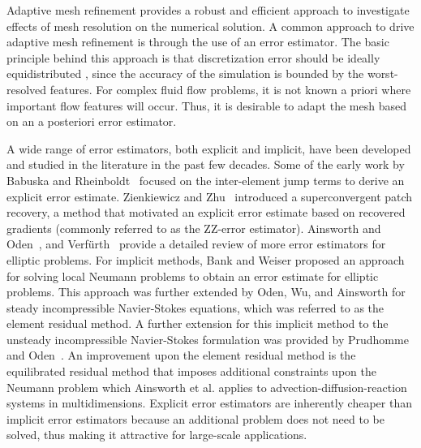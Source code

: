Adaptive mesh refinement provides a robust and efficient approach to investigate effects of mesh resolution on the numerical solution.
A common approach to drive adaptive mesh refinement is through the use of an error estimator.
The basic principle behind this approach is that discretization error should be ideally equidistributed \cite{baker1997mesh}, since the accuracy of the simulation is bounded by the worst-resolved features.
For complex fluid flow problems, it is not known a priori where important flow features will occur. Thus, it is desirable to adapt the mesh based on an a posteriori error estimator.

A wide range of error estimators, both explicit and implicit, have been developed and studied in the literature in the past few decades.
Some of the early work by Babuska and Rheinboldt~\cite{babuvska1978posteriori} focused on the inter-element jump terms to derive an explicit error estimate.
Zienkiewicz and Zhu~\cite{zienkiewicz1992superconvergent1,zienkiewicz1992superconvergent2} introduced a superconvergent patch recovery, a method that motivated an explicit error estimate based on recovered gradients (commonly referred to as the ZZ-error estimator).
Ainsworth and Oden~\cite{ainsworth2011book}, and Verf\"urth~\cite{verfurth1994posteriori} provide a detailed review of more error estimators for elliptic problems.
For implicit methods, Bank and Weiser \cite{bank1985some} proposed an approach for solving local Neumann problems to obtain an error estimate for elliptic problems.
This approach was further extended by Oden, Wu, and Ainsworth \cite{oden1994posteriori} for steady incompressible Navier-Stokes equations, which was referred to as the element residual method.
A further extension for this implicit method to the unsteady incompressible Navier-Stokes formulation was provided by Prudhomme and Oden~\cite{prudhomme1999posteriori}.
An improvement upon the element residual method is the equilibrated residual method that imposes additional constraints upon the Neumann problem which Ainsworth et al. \cite{ainsworth2013fully} applies to advection-diffusion-reaction systems in multidimensions.
Explicit error estimators are inherently cheaper than implicit error estimators because an additional problem does not need to be solved, thus making it attractive for large-scale applications.

